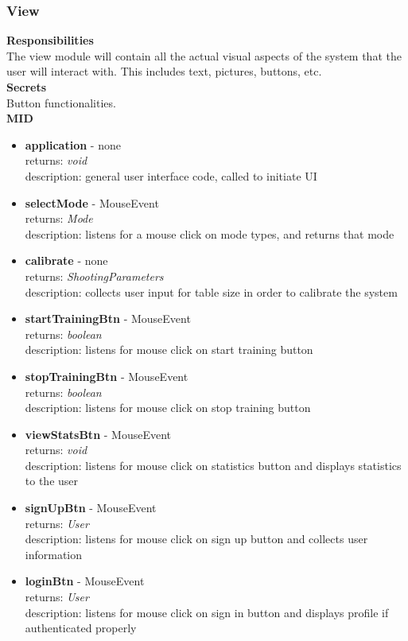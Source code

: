 \documentclass[11pt]{article}
\begin{document}
\subsubsection*{View}
\textbf{Responsibilities} \\
The view module will contain all the actual visual aspects of the system that the user will interact with. This includes text, pictures, buttons, etc. \\
\textbf{Secrets} \\ 
Button functionalities. \\ 
\textbf{MID} \\
\begin{itemize}
\item \textbf{application} - none \\ returns: \textit{void} \\ description: general user interface code, called to initiate UI
\item \textbf{selectMode} - MouseEvent \\ returns: \textit{Mode} \\ description: listens for a mouse click on mode types, and returns that mode
\item \textbf{calibrate} - none \\ returns: \textit{ShootingParameters} \\ description: collects user input for table size in order to calibrate the system
\item \textbf{startTrainingBtn} - MouseEvent \\ returns: \textit{boolean} \\ description: listens for mouse click on start training button
\item \textbf{stopTrainingBtn} - MouseEvent \\ returns: \textit{boolean} \\ description: listens for mouse click on stop training button
\item \textbf{viewStatsBtn} - MouseEvent \\ returns: \textit{void} \\ description: listens for mouse click on statistics button and displays statistics to the user
\item \textbf{signUpBtn} - MouseEvent \\ returns: \textit{User} \\ description: listens for mouse click on sign up button and collects user information
\item \textbf{loginBtn} - MouseEvent \\ returns: \textit{User} \\ description: listens for mouse click on sign in button and displays profile if authenticated properly
\end{itemize}
\end{document}
